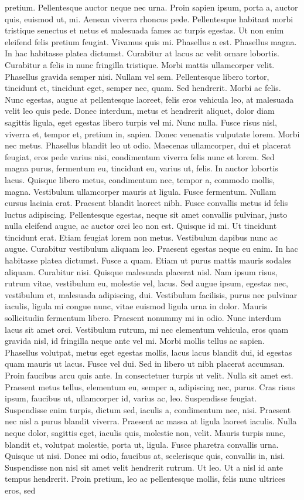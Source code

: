 pretium. Pellentesque auctor neque nec urna. Proin sapien ipsum, porta a, auctor quis, euismod ut, mi. Aenean viverra rhoncus pede. Pellentesque habitant morbi tristique senectus et netus et malesuada fames ac turpis egestas. Ut non enim eleifend felis pretium feugiat. Vivamus quis mi. Phasellus a est. Phasellus magna. In hac habitasse platea dictumst. Curabitur at lacus ac velit ornare lobortis. Curabitur a felis in nunc fringilla tristique. Morbi mattis ullamcorper velit. Phasellus gravida semper nisi. Nullam vel sem. Pellentesque libero tortor, tincidunt et, tincidunt eget, semper nec, quam. Sed hendrerit. Morbi ac felis. Nunc egestas, augue at pellentesque laoreet, felis eros vehicula leo, at malesuada velit leo quis pede. Donec interdum, metus et hendrerit aliquet, dolor diam sagittis ligula, eget egestas libero turpis vel mi. Nunc nulla. Fusce risus nisl, viverra et, tempor et, pretium in, sapien. Donec venenatis vulputate lorem. Morbi nec metus. Phasellus blandit leo ut odio. Maecenas ullamcorper, dui et placerat feugiat, eros pede varius nisi, condimentum viverra felis nunc et lorem. Sed magna purus, fermentum eu, tincidunt eu, varius ut, felis. In auctor lobortis lacus. Quisque libero metus, condimentum nec, tempor a, commodo mollis, magna. Vestibulum ullamcorper mauris at ligula. Fusce fermentum. Nullam cursus lacinia erat. Praesent blandit laoreet nibh. Fusce convallis metus id felis luctus adipiscing. Pellentesque egestas, neque sit amet convallis pulvinar, justo nulla eleifend augue, ac auctor orci leo non est. Quisque id mi. Ut tincidunt tincidunt erat. Etiam feugiat lorem non metus. Vestibulum dapibus nunc ac augue. Curabitur vestibulum aliquam leo. Praesent egestas neque eu enim. In hac habitasse platea dictumst. Fusce a quam. Etiam ut purus mattis mauris sodales aliquam. Curabitur nisi. Quisque malesuada placerat nisl. Nam ipsum risus, rutrum vitae, vestibulum eu, molestie vel, lacus. Sed augue ipsum, egestas nec, vestibulum et, malesuada adipiscing, dui. Vestibulum facilisis, purus nec pulvinar iaculis, ligula mi congue nunc, vitae euismod ligula urna in dolor. Mauris sollicitudin fermentum libero. Praesent nonummy mi in odio. Nunc interdum lacus sit amet orci. Vestibulum rutrum, mi nec elementum vehicula, eros quam gravida nisl, id fringilla neque ante vel mi. Morbi mollis tellus ac sapien. Phasellus volutpat, metus eget egestas mollis, lacus lacus blandit dui, id egestas quam mauris ut lacus. Fusce vel dui. Sed in libero ut nibh placerat accumsan. Proin faucibus arcu quis ante. In consectetuer turpis ut velit. Nulla sit amet est. Praesent metus tellus, elementum eu, semper a, adipiscing nec, purus. Cras risus ipsum, faucibus ut, ullamcorper id, varius ac, leo. Suspendisse feugiat. Suspendisse enim turpis, dictum sed, iaculis a, condimentum nec, nisi. Praesent nec nisl a purus blandit viverra. Praesent ac massa at ligula laoreet iaculis. Nulla neque dolor, sagittis eget, iaculis quis, molestie non, velit. Mauris turpis nunc, blandit et, volutpat molestie, porta ut, ligula. Fusce pharetra convallis urna. Quisque ut nisi. Donec mi odio, faucibus at, scelerisque quis, convallis in, nisi. Suspendisse non nisl sit amet velit hendrerit rutrum. Ut leo. Ut a nisl id ante tempus hendrerit. Proin pretium, leo ac pellentesque mollis, felis nunc ultrices eros, sed 